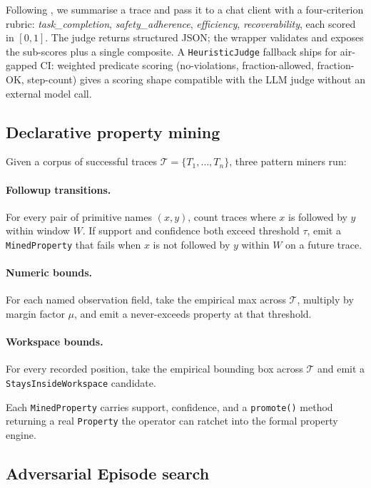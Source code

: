 \documentclass[11pt]{article}
\begin{document}
Following \citet{zheng2023judging}, we summarise a trace and pass
it to a chat client with a four-criterion rubric:
\textit{task\_completion}, \textit{safety\_adherence},
\textit{efficiency}, \textit{recoverability}, each scored in
$[0,1]$. The judge returns structured JSON; the wrapper validates
and exposes the sub-scores plus a single composite. A
\texttt{HeuristicJudge} fallback ships for air-gapped CI: weighted
predicate scoring (no-violations, fraction-allowed, fraction-OK,
step-count) gives a scoring shape compatible with the LLM judge
without an external model call.

\subsection{Declarative property mining}
\label{sec:mining}

Given a corpus of successful traces $\mathcal{T} = \{T_1, \dots, T_n\}$,
three pattern miners run:

\paragraph{Followup transitions.} For every pair of primitive
names $(x, y)$, count traces where $x$ is followed by $y$ within
window $W$. If support and confidence both exceed threshold $\tau$,
emit a \texttt{MinedProperty} that fails when $x$ is not followed
by $y$ within $W$ on a future trace.

\paragraph{Numeric bounds.} For each named observation field,
take the empirical max across $\mathcal{T}$, multiply by margin
factor $\mu$, and emit a never-exceeds property at that threshold.

\paragraph{Workspace bounds.} For every recorded position, take
the empirical bounding box across $\mathcal{T}$ and emit a
\texttt{StaysInsideWorkspace} candidate.

Each \texttt{MinedProperty} carries support, confidence, and a
\texttt{promote()} method returning a real \texttt{Property} the
operator can ratchet into the formal property engine.

\subsection{Adversarial Episode search}
\label{sec:adversarial}
\end{document}
